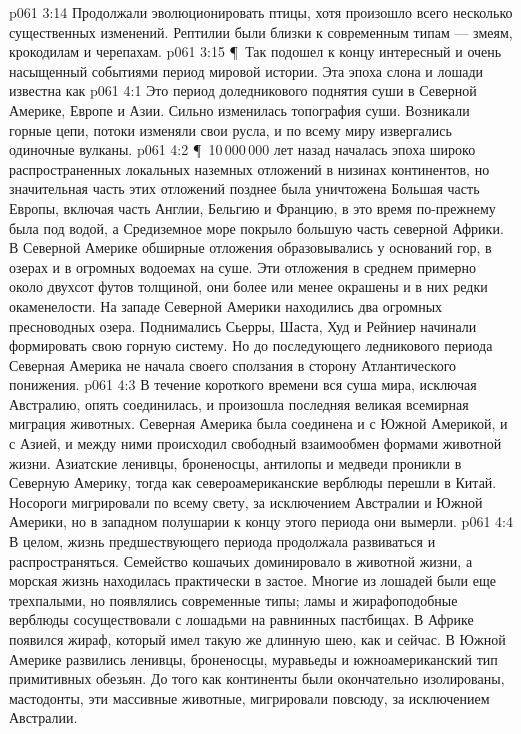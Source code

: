 \vs p061 3:14 Продолжали эволюционировать птицы, хотя произошло всего несколько существенных изменений. Рептилии были близки к современным типам --- змеям, крокодилам и черепахам.
\vs p061 3:15 \P\ Так подошел к концу интересный и очень насыщенный событиями период мировой истории. Эта эпоха слона и лошади известна как 
\vs p061 4:1 Это период доледникового поднятия суши в Северной Америке, Европе и Азии. Сильно изменилась топография суши. Возникали горные цепи, потоки изменяли свои русла, и по всему миру извергались одиночные вулканы.
\vs p061 4:2 \P\ 10\,000\,000 лет назад началась эпоха широко распространенных локальных наземных отложений в низинах континентов, но значительная часть этих отложений позднее была уничтожена Большая часть Европы, включая часть Англии, Бельгию и Францию, в это время по\hyp{}прежнему была под водой, а Средиземное море покрыло большую часть северной Африки. В Северной Америке обширные отложения образовывались у оснований гор, в озерах и в огромных водоемах на суше. Эти отложения в среднем примерно около двухсот футов толщиной, они более или менее окрашены и в них редки окаменелости. На западе Северной Америки находились два огромных пресноводных озера. Поднимались Сьерры, Шаста, Худ и Рейниер начинали формировать свою горную систему. Но до последующего ледникового периода Северная Америка не начала своего сползания в сторону Атлантического понижения.
\vs p061 4:3 В течение короткого времени вся суша мира, исключая Австралию, опять соединилась, и произошла последняя великая всемирная миграция животных. Северная Америка была соединена и с Южной Америкой, и с Азией, и между ними происходил свободный взаимообмен формами животной жизни. Азиатские ленивцы, броненосцы, антилопы и медведи проникли в Северную Америку, тогда как североамериканские верблюды перешли в Китай. Носороги мигрировали по всему свету, за исключением Австралии и Южной Америки, но в западном полушарии к концу этого периода они вымерли.
\vs p061 4:4 В целом, жизнь предшествующего периода продолжала развиваться и распространяться. Семейство кошачьих доминировало в животной жизни, а морская жизнь находилась практически в застое. Многие из лошадей были еще трехпалыми, но появлялись современные типы; ламы и жирафоподобные верблюды сосуществовали с лошадьми на равнинных пастбищах. В Африке появился жираф, который имел такую же длинную шею, как и сейчас. В Южной Америке развились ленивцы, броненосцы, муравьеды и южноамериканский тип примитивных обезьян. До того как континенты были окончательно изолированы, мастодонты, эти массивные животные, мигрировали повсюду, за исключением Австралии.
